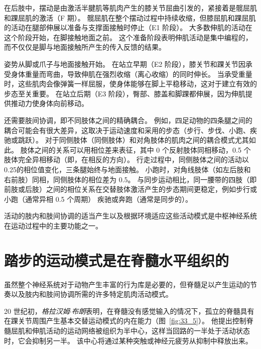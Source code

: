 在后肢中，摆动是由激活半腱肌等肌肉产生的膝关节屈曲引发的，紧接着是髋屈肌和踝屈肌的激活（F 期）。
髋屈肌在整个摆动过程中持续收缩，但膝屈肌和踝屈肌的活动在腿部伸展以准备与支撑面接触时停止（E1 阶段）。
大多数伸肌的活动在这个阶段开始，在脚接触地面之前。
这个准备阶段表明伸肌活动是集中编程的，而不仅仅是脚与地面接触所产生的传入反馈的结果。


姿势从脚或爪子与地面接触开始。
在站立早期（E2 阶段），膝关节和踝关节因承受身体重量而弯曲，导致伸肌在强烈收缩（离心收缩）的同时伸长。
当承受重量时，这些肌肉会像弹簧一样屈服，使身体能够在脚上平稳移动，这对于建立有效的步态至关重要。
在站立后期（E3 阶段），臀部、膝盖和脚踝都伸展，因为伸肌提供推动力使身体向前移动。


还需要肢间协调，即不同肢体之间的精确耦合。
例如，四足动物的四条腿之间的耦合可能会有很大差异，这取决于运动速度和采用的步态（步行、步伐、小跑、疾驰或跳跃）。
对于同侧肢体（同侧肢体）和对角肢体的肌肉之间的耦合模式尤其如此。
肢体之间的关系可以用相位差来表征，其中 0 个反射肢体同相移动，0.5 个肢体完全异相移动（即，在相反的方向）。
行走过程中，同侧肢体之间的活动以0.25的相位值变化，三条腿始终与地面接触。
小跑时，对角线肢体（如左后肢和右前肢）同相，同侧肢体的相位差为 0.5。
与同步运动相比，同一腰带的四肢（即前肢或后肢）之间的相位关系在交替肢体激活产生的步态期间更稳定，例如步行或小跑（通常异相 0.5 个周期） 疾驰或奔跑（通常是同步的）。


活动的肢内和肢间协调的适当产生以及根据环境适应这些活动模式是中枢神经系统在运动过程中的主要功能之一。



\section{踏步的运动模式是在脊髓水平组织的}

虽然整个神经系统对于动物产生丰富的行为库是必要的，但脊髓足以产生运动的节奏以及肢内和肢间协调所需的许多特定肌肉活动模式。


20 世纪初，\textit{格拉汉姆$\cdot$布朗}表明，在脊髓没有感觉输入的情况下，孤立的脊髓具有在踝关节周围产生基本交替运动模式的内在能力（图~\ref{fig:33_5}）。
他提出控制脊髓屈肌和伸肌活动的运动网络被组织为半中心，这样当回路的一半处于活动状态时，它会抑制另一半。
该中心将通过某种突触或神经元疲劳从抑制中释放出来。



